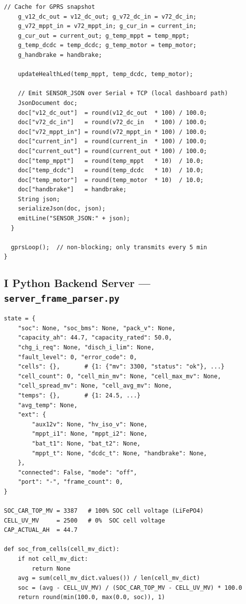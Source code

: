 \begin{lstlisting}[caption={setup() and loop() --- main cooperative execution model}, label={lst:fw-loop}]
    // Cache for GPRS snapshot
    g_v12_dc_out = v12_dc_out; g_v72_dc_in = v72_dc_in;
    g_v72_mppt_in = v72_mppt_in; g_cur_in = current_in;
    g_cur_out = current_out; g_temp_mppt = temp_mppt;
    g_temp_dcdc = temp_dcdc; g_temp_motor = temp_motor;
    g_handbrake = handbrake;

    updateHealthLed(temp_mppt, temp_dcdc, temp_motor);

    // Emit SENSOR_JSON over Serial + TCP (local dashboard path)
    JsonDocument doc;
    doc["v12_dc_out"]  = round(v12_dc_out  * 100) / 100.0;
    doc["v72_dc_in"]   = round(v72_dc_in   * 100) / 100.0;
    doc["v72_mppt_in"] = round(v72_mppt_in * 100) / 100.0;
    doc["current_in"]  = round(current_in  * 100) / 100.0;
    doc["current_out"] = round(current_out * 100) / 100.0;
    doc["temp_mppt"]   = round(temp_mppt   * 10)  / 10.0;
    doc["temp_dcdc"]   = round(temp_dcdc   * 10)  / 10.0;
    doc["temp_motor"]  = round(temp_motor  * 10)  / 10.0;
    doc["handbrake"]   = handbrake;
    String json;
    serializeJson(doc, json);
    emitLine("SENSOR_JSON:" + json);
  }

  gprsLoop();  // non-blocking; only transmits every 5 min
}
\end{lstlisting}

\clearpage

\subsection*{I \quad Python Backend Server --- \texttt{server\_frame\_parser.py}}

\lstset{language=Python, style=bakocode}

\begin{lstlisting}[caption={Shared state dictionary and SOC helpers}, label={lst:py-state}]
state = {
    "soc": None, "soc_bms": None, "pack_v": None,
    "capacity_ah": 44.7, "capacity_rated": 50.0,
    "chg_i_req": None, "disch_i_lim": None,
    "fault_level": 0, "error_code": 0,
    "cells": {},       # {1: {"mv": 3300, "status": "ok"}, ...}
    "cell_count": 0, "cell_min_mv": None, "cell_max_mv": None,
    "cell_spread_mv": None, "cell_avg_mv": None,
    "temps": {},       # {1: 24.5, ...}
    "avg_temp": None,
    "ext": {
        "aux12v": None, "hv_iso_v": None,
        "mppt_i1": None, "mppt_i2": None,
        "bat_t1": None, "bat_t2": None,
        "mppt_t": None, "dcdc_t": None, "handbrake": None,
    },
    "connected": False, "mode": "off",
    "port": "-", "frame_count": 0,
}

SOC_CAR_TOP_MV = 3387   # 100% SOC cell voltage (LiFePO4)
CELL_UV_MV     = 2500   # 0%  SOC cell voltage
CAP_ACTUAL_AH  = 44.7

def soc_from_cells(cell_mv_dict):
    if not cell_mv_dict:
        return None
    avg = sum(cell_mv_dict.values()) / len(cell_mv_dict)
    soc = (avg - CELL_UV_MV) / (SOC_CAR_TOP_MV - CELL_UV_MV) * 100.0
    return round(min(100.0, max(0.0, soc)), 1)
\end{lstlisting}

